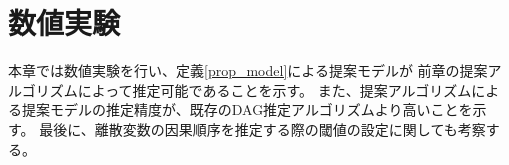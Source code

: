 
\section{数値実験}
\label{part:experience}

本章では数値実験を行い、定義\ref{prop_model}による提案モデルが
前章の提案アルゴリズムによって推定可能であることを示す。
また、提案アルゴリズムによる提案モデルの推定精度が、既存のDAG推定アルゴリズムより高いことを示す。
最後に、離散変数の因果順序を推定する際の閾値の設定に関しても考察する。
%

%

%

